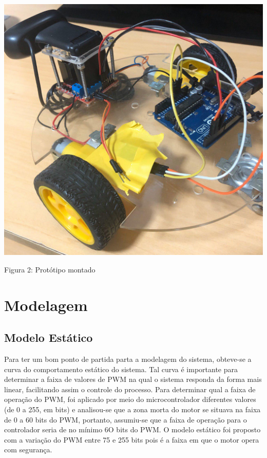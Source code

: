 \documentclass{article}
\begin{document}
\begin{center}
\centering
  \includegraphics[scale=0.15]{imagens/montagemFinal.jpg}
  
  \caption{Figura 2: Protótipo montado}
\end{center}

\section{Modelagem}


\subsection{Modelo Estático}
Para ter um bom ponto de partida parta a modelagem do sistema, obteve-se a curva do comportamento estático do sistema. Tal curva é importante para determinar a faixa de valores de PWM na qual o sistema responda da forma mais linear, facilitando assim o controle do processo.
Para determinar qual a faixa de operação do PWM, foi aplicado por meio do microcontrolador diferentes valores (de 0 a 255, em bits) e analisou-se que a zona morta do motor se situava na faixa de 0 a 60 bits do PWM, portanto, assumiu-se que a faixa de operação para o controlador seria de no mínimo 6O bits do PWM. O modelo estático foi proposto com a variação do PWM entre 75 e 255 bits pois é a faixa em que o motor opera com segurança.
\end{document}
